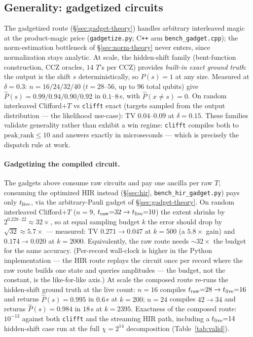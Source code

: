 \documentclass[11pt]{article}
\begin{document}
\subsection{Generality: gadgetized circuits}\label{sec:gadget}
The gadgetized route (\S\ref{sec:gadget-theory}) handles arbitrary
interleaved magic at the product-magic price
(\texttt{gadgetize.py}; C\texttt{++} arm \texttt{bench\_gadget.cpp}); the
norm-estimation bottleneck of \S\ref{sec:norm-theory} never enters, since
normalization stays analytic. At scale, the hidden-shift family
(bent-function construction, CCZ oracles, $14$ $T$'s per CCZ) provides
\emph{built-in exact ground truth}: the output is the shift $s$
deterministically, so $P(s)=1$ at any size. Measured at $\delta=0.3$:
$n{=}16/24/32/40$ ($t=28$--$56$, up to $96$ total qubits) give
$\hat P(s) = 0.99/0.94/0.90/0.92$ in $0.1$--$8$\,s, with
$\hat P(x\!\neq\!s)=0$. On random interleaved Clifford$+T$ vs \texttt{clifft}
exact (targets sampled from the output distribution --- the likelihood
use-case): TV $0.04$--$0.09$ at $\delta=0.15$. These families validate
generality rather than exhibit a win regime: \texttt{clifft} compiles both to
$\mathrm{peak\_rank}\le10$ and answers exactly in microseconds --- which is
precisely the dispatch rule at work.

\paragraph{Gadgetizing the compiled circuit.} The gadgets above consume raw
circuits and pay one ancilla per raw $T$; consuming the optimized HIR
instead (\S\ref{sec:hir}, \texttt{bench\_hir\_gadget.py}) pays only
$t_{\rm live}$, via the arbitrary-Pauli gadget of \S\ref{sec:gadget-theory}.
On random interleaved Clifford$+T$ ($n{=}9$,
$t_{\rm raw}{=}32 \to t_{\rm live}{=}10$) the extent shrinks by
$2^{0.228\cdot22}\approx32\times$, so at equal sampling budget $k$ the error
should drop by $\sqrt{32}\approx5.7\times$ --- measured: TV $0.271\to0.047$
at $k{=}500$ (a $5.8\times$ gain) and $0.174\to0.020$ at $k{=}2000$.
Equivalently, the raw route needs ${\sim}32\times$ the budget for the same
accuracy. (Per-record wall-clock is higher in the Python implementation ---
the HIR route replays the circuit once per record where the raw route builds
one state and queries amplitudes --- the budget, not the constant, is the
like-for-like axis.) At scale the composed route re-runs the hidden-shift
ground truth at the live count: $n{=}16$ compiles
$t_{\rm raw}{=}28 \to t_{\rm live}{=}16$ and returns $\hat P(s)=0.995$ in
$0.6$\,s at $k{=}200$; $n{=}24$ compiles $42\to34$ and returns
$\hat P(s)=0.984$ in $18$\,s at $k{=}2395$. Exactness of the composed
route: $10^{-13}$ against
both \texttt{clifft} and the streaming HIR path, including a
$t_{\rm live}{=}14$ hidden-shift case run at the full $\chi=2^{14}$
decomposition (Table~\ref{tab:valid}).
\end{document}
